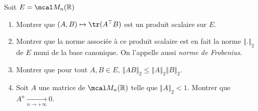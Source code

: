 Soit $E=\mcal M_n(\mathbb{R})$

\begin{enumerate}
\item Montrer que $(A,B)\mapsto \tr(A^\top B)$ est un produit scalaire sur $E$.
\item Montrer que la norme associée à ce produit scalaire est en fait la norme $\left\Vert.\right\Vert_2$ de $E$ muni de la base canonique. On l'appelle aussi \emph{norme de Frobenius}.
\item Montrer que pour tout $A,B\in E$, $\left\Vert AB \right\Vert_2\leqslant \left\Vert A\right\Vert_2\left\Vert B\right\Vert_2$.
\item Soit $A$ une matrice de $\mcal M_n(\mathbb{R})$ telle que $\left\Vert A\right\Vert_2 <1$. Montrer que $A^n\xrightarrow[n\to +\infty]{}0$.
\end{enumerate}
